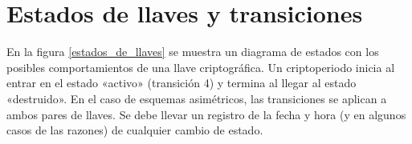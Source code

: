 %
%
%
%
%
%
%
%

\section{Estados de llaves y transiciones}

En la figura \ref{estados_de_llaves} se muestra un diagrama de estados con
los posibles comportamientos de una llave criptográfica. Un criptoperiodo
inicia al entrar en el estado «activo» (transición 4) y termina al llegar al
estado «destruido». En el caso de esquemas asimétricos, las transiciones se
aplican a ambos pares de llaves. Se debe llevar un registro de la fecha y hora
(y en algunos casos de las razones) de cualquier cambio de estado.

